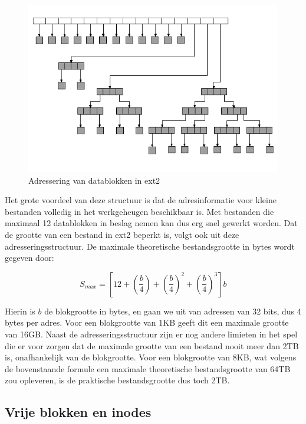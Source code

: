 \begin{figure}
\begin{center}
\includegraphics[width=120mm]{images/fig0419.png}
\caption{Adressering van datablokken in ext2}
\label{extAdressering}
\end{center}
\end{figure}

Het grote voordeel van deze structuur is dat de adresinformatie voor kleine bestanden volledig in het werkgeheugen
beschikbaar is. Met bestanden die maximaal 12 datablokken in beslag nemen kan dus erg snel gewerkt worden. Dat de
grootte van een bestand in ext2 beperkt is, volgt ook uit deze adresseringsstructuur. De maximale theoretische bestandsgrootte
in bytes wordt gegeven door:

\begin{displaymath}
S_{max} = \left[12 + \left(\frac{b}{4}\right) + \left(\frac{b}{4}\right)^{2} + \left(\frac{b}{4}\right)^{3}\right]b
\end{displaymath}

Hierin is $b$ de blokgrootte in bytes, en gaan we uit van adressen van 32 bits, dus 4 bytes per adres. Voor een
blokgrootte van 1KB geeft dit een maximale grootte van 16GB. Naast de adresseringsstructuur zijn er nog andere limieten in het spel die er voor zorgen dat de maximale grootte van een bestand nooit meer dan 2TB is, onafhankelijk van de blokgrootte. Voor een blokgrootte van 8KB, wat volgens de bovenstaande formule een maximale theoretische bestandsgrootte van 64TB zou opleveren, is de praktische bestandsgrootte dus toch 2TB.

\subsection{Vrije blokken en inodes}

